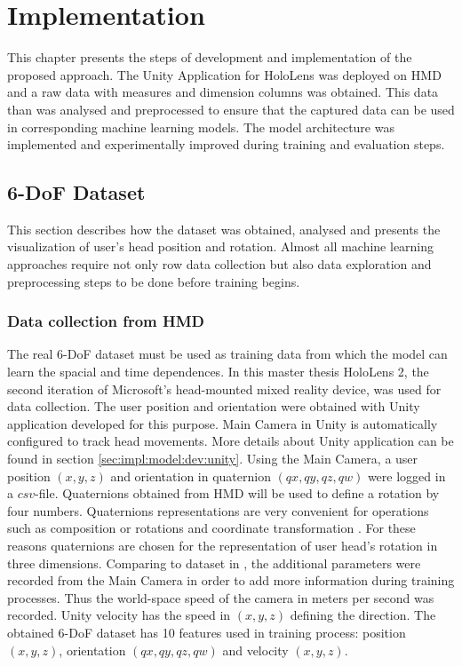 \chapter{Implementation}
\label{sec:impl}
This chapter presents the steps of development and implementation of the proposed approach. The Unity Application for HoloLens was deployed on HMD and a raw data with measures and dimension columns was obtained. This data than was analysed and preprocessed to ensure that the captured data can be used in corresponding machine learning models. The model architecture was implemented and experimentally improved during training and evaluation steps. 

\section{6-DoF Dataset}
\label{sec:impl:dataset}
This section describes how the dataset was obtained, analysed and presents the visualization of user's head position and rotation. Almost all machine learning approaches require not only row data collection but also data exploration and preprocessing steps to be done before training begins.

\subsection{Data collection from HMD}
\label{sec:impl:dataset:HL}
The real 6-DoF dataset must be used as training data from which the model can learn the spacial and time dependences. In this master thesis HoloLens 2, the second iteration of Microsoft's head-mounted mixed reality device, was used for data collection. The user position and orientation were obtained with Unity application developed for this purpose. Main Camera in Unity is automatically configured to track head movements. More details about Unity application can be found in section \ref{sec:impl:model:dev:unity}. Using the Main Camera, a user position $(x, y, z)$ and orientation in quaternion $(qx, qy, qz, qw)$ were logged in a $csv$-file. Quaternions obtained from HMD will be used to define a rotation by four numbers. Quaternions representations are very convenient for operations such as composition or rotations and coordinate transformation \cite{principles_robot_motion_book}. For these reasons quaternions are chosen for the representation of user head's rotation in three dimensions. Comparing to dataset in \cite{serhan_kalman}, the additional parameters were recorded from the Main Camera in order to add more information during training processes. Thus the world-space speed of the camera in meters per second was recorded. Unity velocity has the speed in $(x, y, z)$ defining the direction. The obtained 6-DoF dataset has 10 features used in training process: position $(x, y, z)$, orientation $(qx, qy, qz, qw)$ and velocity $(x, y, z)$.

